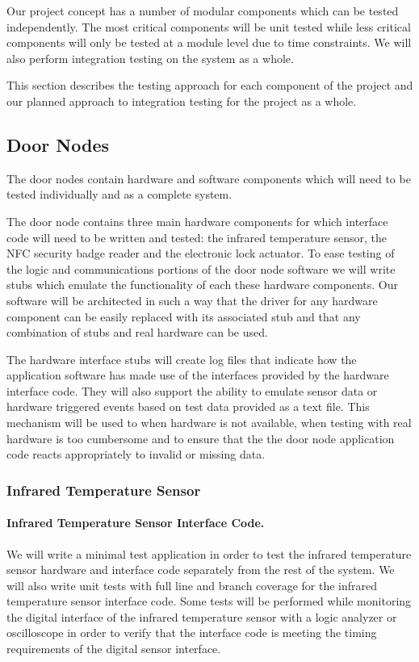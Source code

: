Our project concept has a number of modular components which can be tested
independently. The most critical components will be unit tested while less
critical components will only be tested at a module level due to time
constraints. We will also perform integration testing on the system as a whole.

This section describes the testing approach for each component of the project
and our planned approach to integration testing for the project as a whole.

\subsection{Door Nodes}

The door nodes contain hardware and software components which will need to be
tested individually and as a complete system.

The door node contains three main hardware components for which interface code
will need to be written and tested: the infrared temperature sensor, the NFC
security badge reader and the electronic lock actuator. To ease testing of the
logic and communications portions of the door node software we will write stubs
which emulate the functionality of each these hardware components. Our software
will be architected in such a way that the driver for any hardware component can
be easily replaced with its associated stub and that any combination of stubs
and real hardware can be used.

The hardware interface stubs will create log files that indicate how the
application software has made use of the interfaces provided by the hardware
interface code. They will also support the ability to emulate sensor data or
hardware triggered events based on test data provided as a text file. This
mechanism will be used to when hardware is not available, when testing with real
hardware is too cumbersome and to ensure that the the door node application code
reacts appropriately to invalid or missing data.

\subsubsection{Infrared Temperature Sensor}

\paragraph{Infrared Temperature Sensor Interface Code.}
We will write a minimal test application in order to test the infrared
temperature sensor hardware and interface code separately from the rest of the
system. We will also write unit tests with full line and branch coverage for the
infrared temperature sensor interface code. Some tests will be performed while
monitoring the digital interface of the infrared temperature sensor with a logic
analyzer or oscilloscope in order to verify that the interface code is meeting
the timing requirements of the digital sensor interface.

